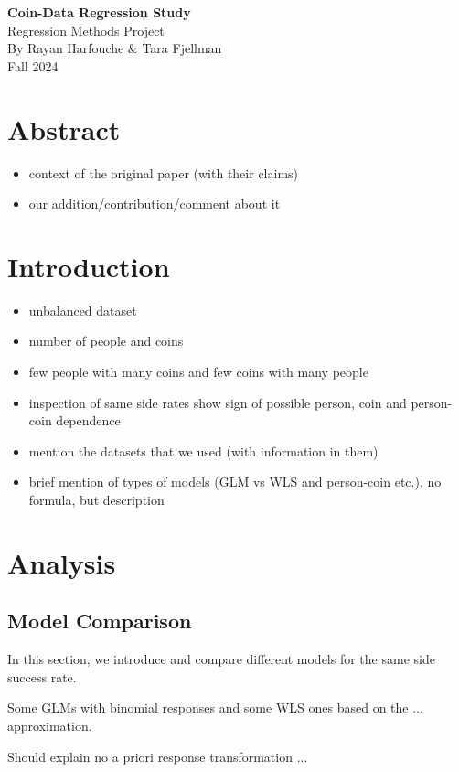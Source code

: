\documentclass[a4paper, 12pt,oneside]{article}
\begin{document}
 
	\begin{center}
	    \Large
	    \textbf{Coin-Data Regression Study}\\
	    \large
		Regression Methods Project \\
	    By Rayan Harfouche \& Tara Fjellman \\
	    \small{Fall 2024}
	\end{center}
	\section*{Abstract}
	\begin{itemize}
		\item context of the original paper (with their claims) 
		\item our addition/contribution/comment about it
	\end{itemize}
	\section{Introduction}
	\begin{itemize}
		\item unbalanced dataset 
		\item number of people and coins
		\item few people with many coins and few coins with many people
		\item inspection of same side rates show sign of possible person, coin and person-coin dependence
		\item mention the datasets that we used (with information in them)
		\item brief mention of types of models (GLM vs WLS and person-coin etc.). no formula, but description
	\end{itemize}
	\section{Analysis}
		\subsection{Model Comparison}
			In this section, we introduce and compare different models for the same side success rate. 

			Some GLMs with binomial responses and some WLS ones based on the ... approximation.
			
			Should explain no a priori response transformation ...
			
\end{document}
